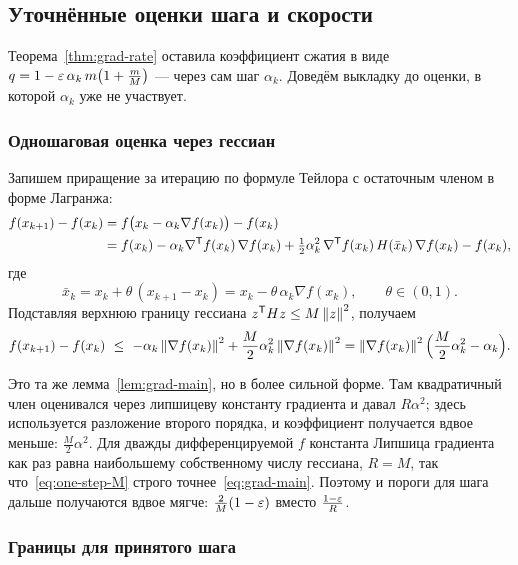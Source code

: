 
\subsection{Уточнённые оценки шага и скорости}

Теорема~\ref{thm:grad-rate} оставила коэффициент сжатия в виде
$q = 1 - \varepsilon\,\alpha_k\, m\big(1 + \frac{m}{M}\big)$ — через сам шаг $\alpha_k$.
Доведём выкладку до оценки, в которой $\alpha_k$ уже не участвует.

\subsubsection*{Одношаговая оценка через гессиан}

Запишем приращение за итерацию по формуле Тейлора с остаточным членом в форме
Лагранжа:
\begin{align*}
  f(x_{k+1}) - f(x_k)
  &= f\big(x_k - \alpha_k \nabla f(x_k)\big) - f(x_k) \\
  &= f(x_k) - \alpha_k \nabla^{\mathsf{T}} f(x_k)\,\nabla f(x_k)
     + \tfrac{1}{2}\alpha_k^2\, \nabla^{\mathsf{T}} f(x_k)\, H(\bar{x}_k)\, \nabla f(x_k)
     - f(x_k) ,
\end{align*}
где
\[
  \bar{x}_k = x_k + \theta\,(x_{k+1} - x_k)
            = x_k - \theta\,\alpha_k \nabla f(x_k) , \qquad \theta \in (0,1) .
\]
Подставляя верхнюю границу гессиана $z^{\mathsf{T}} H z \le M\left\lVert z \right\rVert^2$, получаем
\begin{equation}\label{eq:one-step-M}
  f(x_{k+1}) - f(x_k)
  \ \le\ -\alpha_k \left\lVert \nabla f(x_k) \right\rVert^2
          + \frac{M}{2}\alpha_k^2 \left\lVert \nabla f(x_k) \right\rVert^2
  = \left\lVert \nabla f(x_k) \right\rVert^2 \Big( \frac{M}{2}\alpha_k^2 - \alpha_k \Big) .
\end{equation}

\begin{idea}
Это та же лемма~\ref{lem:grad-main}, но в более сильной форме. Там квадратичный
член оценивался через липшицеву константу градиента и давал $R\alpha^2$; здесь
используется разложение второго порядка, и коэффициент получается вдвое меньше:
$\frac{M}{2}\alpha^2$. Для дважды дифференцируемой $f$ константа Липшица
градиента как раз равна наибольшему собственному числу гессиана, $R = M$,
так что~\eqref{eq:one-step-M} строго точнее~\eqref{eq:grad-main}.
Поэтому и пороги для шага дальше получаются вдвое мягче:
$\frac{2}{M}(1-\varepsilon)$ вместо $\frac{1-\varepsilon}{R}$.
\end{idea}

\subsubsection*{Границы для принятого шага}

